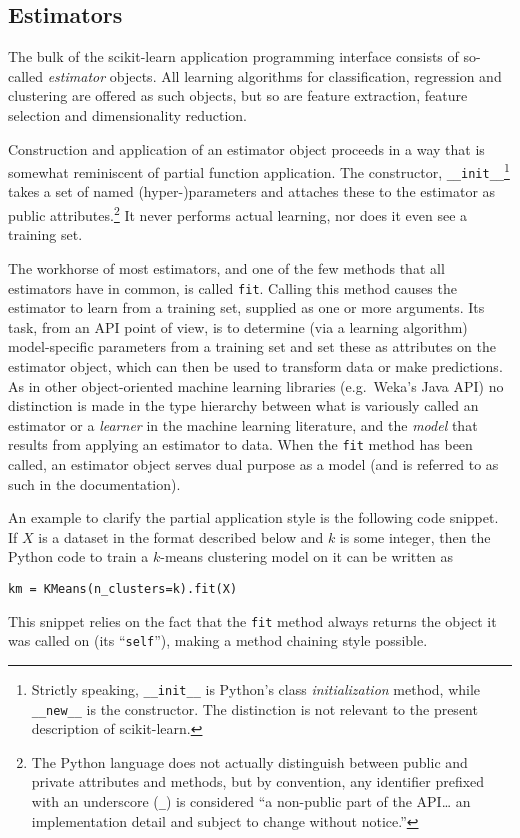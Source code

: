 \documentclass[a4paper]{article}
\begin{document}
\subsection{Estimators}


The bulk of the scikit-learn application programming interface
consists of so-called \textit{estimator} objects.
All learning algorithms for classification, regression and clustering
are offered as such objects,
but so are feature extraction, feature selection and dimensionality reduction.

Construction and application of an estimator object
proceeds in a way that is somewhat reminiscent of partial function application.
The constructor, \texttt{\_\_init\_\_}\footnote{
  Strictly speaking, \texttt{\_\_init\_\_} is Python's
  class \textit{initialization} method,
  while \texttt{\_\_new\_\_} is the constructor.
  The distinction is not relevant to the present description of scikit-learn.}
takes a set of named (hyper-)parameters
and attaches these to the estimator as public attributes.\footnote{
  The Python language does not actually distinguish between public and private
  attributes and methods,
  but by convention, any identifier prefixed with an underscore (\texttt{\_})
  is considered ``a non-public part of the API\ldots
  an implementation detail and subject to change without notice.''
  }
It never performs actual learning, nor does it even see a training set.

The workhorse of most estimators, and one of the few methods
that all estimators have in common, is called \texttt{fit}.
Calling this method causes the estimator to learn from a training set,
supplied as one or more arguments.
Its task, from an API point of view,
is to determine (via a learning algorithm) model-specific parameters
from a training set and set these as attributes on the estimator object,
which can then be used to transform data or make predictions.
As in other object-oriented machine learning libraries
(e.g.\ Weka's Java API)
no distinction is made in the type hierarchy
between what is variously called an estimator or a \textit{learner}
in the machine learning literature,
and the \textit{model} that results from applying an estimator to data.
When the \texttt{fit} method has been called,
an estimator object serves dual purpose as a model
(and is referred to as such in the documentation).

An example to clarify the partial application style
is the following code snippet.
If $X$ is a dataset in the format described below and $k$ is some integer,
then the Python code to train a $k$-means clustering model on it
can be written as
\begin{verbatim}
km = KMeans(n_clusters=k).fit(X)
\end{verbatim}
This snippet relies on the fact that the \texttt{fit} method
always returns the object it was called on (its ``\texttt{self}''),
making a method chaining style possible.
\end{document}
